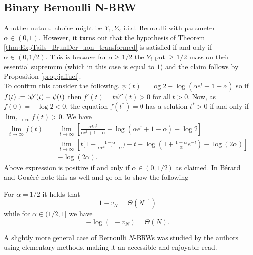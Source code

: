 \subsection{Binary Bernoulli N-BRW}\label{subsec:binary_bernoulli_BRW}
Another natural choice might be $Y_1, Y_2$ i.i.d. Bernoulli with parameter $\alpha \in (0, 1)$. However, it turns out that the hypothesis of Theorem \ref{thm:ExpTails_BrunDer_non_transformed} is satisfied if and only if $\alpha \in (0, 1/2)$. This is because for $\alpha \geq 1/2$ the $Y_i$ put $\geq 1/2$ mass on their essential supremum (which in this case is equal to $1$) and the claim follows by Proposition \ref{prop:jaffuel}. \\

To confirm this consider the following. $\psi(t) = \log 2 + \log (\alpha e^t + 1 - \alpha)$ so if $f(t) \vcentcolon= t \psi'(t) - \psi(t)$ then $f'(t) = t \psi''(t) > 0$ for all $t > 0$. Now, as $f(0) = -\log 2 < 0$, the equation $f(t^*) = 0$ has a solution $t^* > 0$ if and only if $\lim_{t \to \infty} f(t) > 0$. We have
\begin{align*}
\lim\limits_{t \to \infty} f(t) &= \lim\limits_{t \to \infty} \left[\frac{\alpha t e^t}{\alpha e^t + 1 - \alpha} - \log(\alpha e^t + 1 - \alpha) - \log 2 \right] \\
								&= \lim\limits_{t \to \infty} \left[ t \big( 1 - \frac{1 - \alpha}{\alpha e^t + 1 - \alpha}\big) - t - \log (1 + \frac{1-\alpha}{\alpha} e^{-t}) - \log(2 \alpha) \right] \\
								&= - \log(2\alpha). 
\end{align*} 
Above expression is positive if and only if $\alpha \in (0, 1/2)$ as claimed. In \cite{exp_tails} Bérard and Gouéré note this as well and go on to show the following
\begin{theorem}
For $\alpha = 1/2$ it holds that
\begin{equation}\nonumber
1 - v_N = \Theta(N^{-1})
\end{equation}
while for $\alpha \in (1/2, 1]$ we have
\begin{equation}\nonumber
- \log (1 - v_N) = \Theta(N). 
\end{equation}
\end{theorem}
\begin{remark}A slightly more general case of Bernoulli $N$-BRWs was studied by the authors \cite{couronne2014branching} using elementary methods, making it an accessible and enjoyable read. 
\end{remark}


